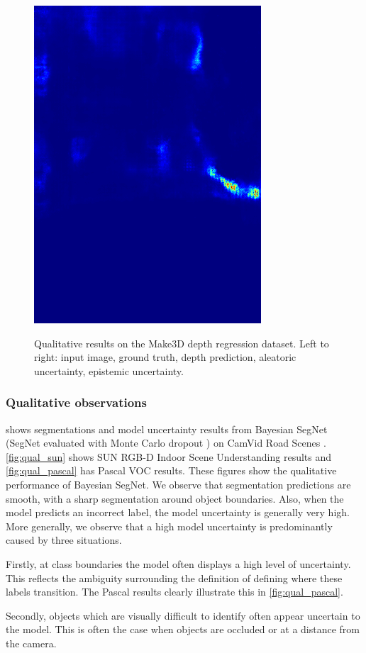 \begin{figure}[p]
{\includegraphics[width=0.3\linewidth]{segnet_11_output_4.png}}
\caption[Qualitative results on the Make3D depth regression dataset.]{Qualitative results on the Make3D depth regression dataset. Left to right: input image, ground truth, depth prediction, aleatoric uncertainty, epistemic uncertainty. 
}
\label{fig:make3d_qual}
\end{figure}


\subsubsection{Qualitative observations}
 shows segmentations and model uncertainty results from Bayesian SegNet (SegNet evaluated with Monte Carlo dropout \citep{kendall2015bayesian}) on CamVid Road Scenes \citep{brostow2009semantic}. \cref{fig:qual_sun} shows SUN RGB-D Indoor Scene Understanding \citep{song2015sun} results and \cref{fig:qual_pascal} has Pascal VOC \citep{pascal} results. These figures show the qualitative performance of Bayesian SegNet. We observe that segmentation predictions are smooth, with a sharp segmentation around object boundaries. Also, when the model predicts an incorrect label, the model uncertainty is generally very high. More generally, we observe that a high model uncertainty is predominantly caused by three situations.

Firstly, at class boundaries the model often displays a high level of uncertainty. This reflects the ambiguity surrounding the definition of defining where these labels transition. The Pascal results clearly illustrate this in \cref{fig:qual_pascal}.

Secondly, objects which are visually difficult to identify often appear uncertain to the model. This is often the case when objects are occluded or at a distance from the camera.

